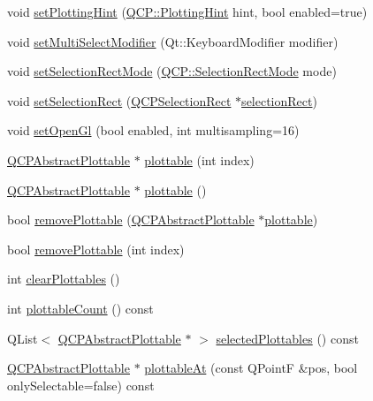 \begin{DoxyCompactItemize}
\item 
void \hyperlink{class_q_custom_plot_a3b7c97bb6c16464e9e15190c07abe9a9}{set\+Plotting\+Hint} (\hyperlink{namespace_q_c_p_a5400e5fcb9528d92002ddb938c1f4ef4}{Q\+C\+P\+::\+Plotting\+Hint} hint, bool enabled=true)
\item 
void \hyperlink{class_q_custom_plot_a8fc96e3b5138a06759a2a90c166df516}{set\+Multi\+Select\+Modifier} (Qt\+::\+Keyboard\+Modifier modifier)
\item 
void \hyperlink{class_q_custom_plot_a810ef958ebe84db661c7288b526c0deb}{set\+Selection\+Rect\+Mode} (\hyperlink{namespace_q_c_p_ac9aa4d6d81ac76b094f9af9ad2d3aacf}{Q\+C\+P\+::\+Selection\+Rect\+Mode} mode)
\item 
void \hyperlink{class_q_custom_plot_a0c09f96df15faa4799ad7051bb16cf33}{set\+Selection\+Rect} (\hyperlink{class_q_c_p_selection_rect}{Q\+C\+P\+Selection\+Rect} $\ast$\hyperlink{class_q_custom_plot_ad7df2bcbba307e644db383b449e31efd}{selection\+Rect})
\item 
void \hyperlink{class_q_custom_plot_a7db1adc09016329f3aef7c60da935789}{set\+Open\+Gl} (bool enabled, int multisampling=16)
\item 
\hyperlink{class_q_c_p_abstract_plottable}{Q\+C\+P\+Abstract\+Plottable} $\ast$ \hyperlink{class_q_custom_plot_a32de81ff53e263e785b83b52ecd99d6f}{plottable} (int index)
\item 
\hyperlink{class_q_c_p_abstract_plottable}{Q\+C\+P\+Abstract\+Plottable} $\ast$ \hyperlink{class_q_custom_plot_adea38bdc660da9412ba69fb939031567}{plottable} ()
\item 
bool \hyperlink{class_q_custom_plot_af3dafd56884208474f311d6226513ab2}{remove\+Plottable} (\hyperlink{class_q_c_p_abstract_plottable}{Q\+C\+P\+Abstract\+Plottable} $\ast$\hyperlink{class_q_custom_plot_a32de81ff53e263e785b83b52ecd99d6f}{plottable})
\item 
bool \hyperlink{class_q_custom_plot_afc210e0021480f8119bccf37839dbcc8}{remove\+Plottable} (int index)
\item 
int \hyperlink{class_q_custom_plot_a9a409bb3201878adb7ffba1c89c4e004}{clear\+Plottables} ()
\item 
int \hyperlink{class_q_custom_plot_a5f4f15991c14bf9ad659bb2a19dfbed4}{plottable\+Count} () const
\item 
Q\+List$<$ \hyperlink{class_q_c_p_abstract_plottable}{Q\+C\+P\+Abstract\+Plottable} $\ast$ $>$ \hyperlink{class_q_custom_plot_a747faaab57c56891e901a1e97fa4359a}{selected\+Plottables} () const
\item 
\hyperlink{class_q_c_p_abstract_plottable}{Q\+C\+P\+Abstract\+Plottable} $\ast$ \hyperlink{class_q_custom_plot_acddbbd8b16dd633f0d94e5a736fbd8cf}{plottable\+At} (const Q\+PointF \&pos, bool only\+Selectable=false) const

\end{DoxyCompactItemize}
